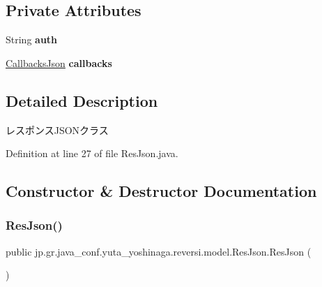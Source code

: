 \subsection*{Private Attributes}
\begin{DoxyCompactItemize}
\item 
\mbox{\label{classjp_1_1gr_1_1java__conf_1_1yuta__yoshinaga_1_1reversi_1_1model_1_1_res_json_a025a6255e8c44b7a6c1e1503e1195e84}} 
String {\bfseries auth}
\item 
\mbox{\label{classjp_1_1gr_1_1java__conf_1_1yuta__yoshinaga_1_1reversi_1_1model_1_1_res_json_a39c4406106b7bfae1aeb9c56f4a51f46}} 
\mbox{\hyperlink{classjp_1_1gr_1_1java__conf_1_1yuta__yoshinaga_1_1reversi_1_1model_1_1_callbacks_json}{Callbacks\+Json}} {\bfseries callbacks}
\end{DoxyCompactItemize}


\subsection{Detailed Description}
レスポンス\+J\+S\+O\+Nクラス 

Definition at line 27 of file Res\+Json.\+java.



\subsection{Constructor \& Destructor Documentation}
\mbox{\label{classjp_1_1gr_1_1java__conf_1_1yuta__yoshinaga_1_1reversi_1_1model_1_1_res_json_ac67902ff0ff40d4b25e3ded78b5098a2}} 
\subsubsection{\texorpdfstring{Res\+Json()}{ResJson()}}
{\footnotesize\ttfamily public jp.\+gr.\+java\+\_\+conf.\+yuta\+\_\+yoshinaga.\+reversi.\+model.\+Res\+Json.\+Res\+Json (\begin{DoxyParamCaption}{ }\end{DoxyParamCaption})}



